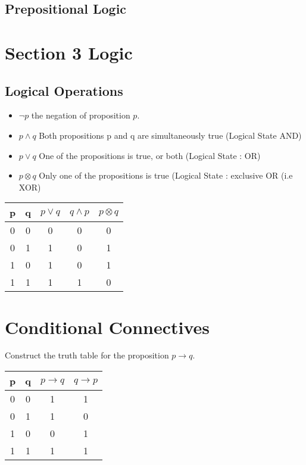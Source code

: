 \subsection*{Prepositional Logic}

\section{Section 3 Logic}
\subsection{Logical Operations}
\begin{itemize}
\item $\neg p$ the negation of proposition $p$.
\item $p \wedge q$ Both propositions p and q are simultaneously true (Logical State AND)
\item $p \vee q $ One of the propositions is true, or both (Logical State : OR)
\item $p \otimes q$ Only one of the propositions is true (Logical State : exclusive OR (i.e XOR)
\end{itemize}
\begin{center}
\begin{tabular}{|c|c|c|c|c|}
\hline
p & q & $p \vee q$ & $q \wedge p$ & $p \otimes q$ \\
\hline
0 & 0 & 0 & 0 & 0 \\
0 & 1 & 1 & 0 & 1\\
1 & 0 & 1 & 0 & 1 \\
1 & 1 & 1 & 1 & 0\\
\hline
\end{tabular}
\end{center}
\section{Conditional Connectives}
Construct the truth table for the proposition $p \rightarrow q$.

\begin{center}
\begin{tabular}{|c|c|c|c|}
\hline
p & q & $p \rightarrow q$ & $q \rightarrow p$ \\
\hline
0 & 0 & 1& 1 \\
0 & 1 & 1 & 0 \\
1 & 0 & 0 & 1 \\
1 & 1 & 1 & 1 \\
\hline
\end{tabular}
\end{center}


